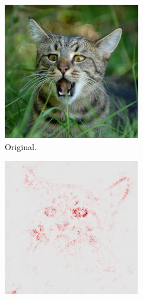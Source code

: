 \documentclass[sigconf]{acmart}
\begin{document}
\begin{figure}[ht]
    \centering
    \begin{subfigure}{0.32\linewidth}
      \includegraphics[width=\linewidth]{figures/cat.JPEG}
      \caption{Original.}
      \label{fig:lrp_cat_orig}
    \end{subfigure}
    \begin{subfigure}{0.32\linewidth}
      \includegraphics[width=\linewidth]{figures/lrp_cat_heatmap.png}

\end{subfigure}
\end{figure}
\end{document}
